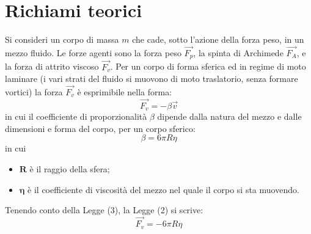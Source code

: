 \documentclass[11pt]{article}
\begin{document}
\section{Richiami teorici}
Si consideri un corpo di massa $m$ che cade, sotto l'azione della forza peso, in un mezzo fluido. Le forze agenti sono la forza peso $\vec{F_p}$, la spinta di Archimede $\vec{F_A}$, e la forza di attrito viscoso $\vec{F_v}$. Per un corpo di forma sferica ed in regime di moto laminare (i vari strati del fluido si muovono di moto traslatorio, senza formare vortici) la forza $\vec{F_v}$ è esprimibile nella forma:
\begin{equation}
    \vec{F_v}=-\beta\vec{v} 
\end{equation}
in cui il coefficiente di proporzionalità $\beta$ dipende dalla natura del mezzo e dalle dimensioni e forma del corpo, per un corpo sferico:
\begin{equation}
    \beta=6\pi R\eta
\end{equation}
in cui
\begin{itemize}
    \item $\mathbf{R}$ è il raggio della sfera;
    \item $\mathbf{\eta}$ è il coefficiente di viscosità del mezzo nel quale il corpo si sta muovendo.
\end{itemize}
Tenendo conto della Legge (3), la Legge (2) si scrive:
\begin{equation}
    \vec{F_v}=-6\pi R\eta
\end{equation}
\end{document}
